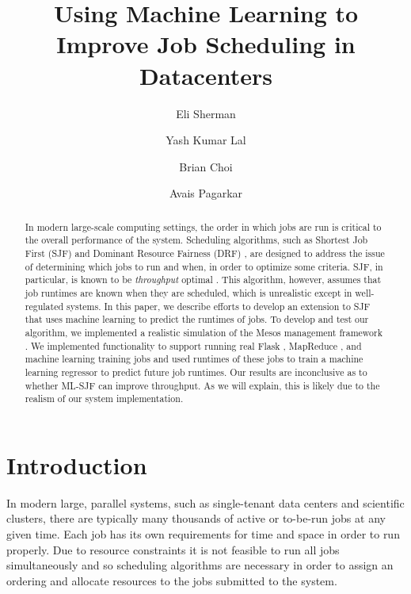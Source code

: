 \documentclass{hotnets19}
\begin{document}


\title{Using Machine Learning to Improve Job Scheduling in Datacenters}

\author{Eli Sherman \and Yash Kumar Lal \and Brian Choi \and Avais Pagarkar}

\maketitle

\begin{abstract}
In modern large-scale computing settings, the order in which jobs are run is critical to the overall performance of the system. Scheduling algorithms, such as Shortest Job First (SJF) and Dominant Resource Fairness (DRF) \cite{ghodsi2011dominant}, are designed to address the issue of determining which jobs to run and when, in order to optimize some criteria. SJF, in particular, is known to be \emph{throughput} optimal \cite{arpaci2015operating}. This algorithm, however, assumes that job runtimes are known when they are scheduled, which is unrealistic except in well-regulated systems. In this paper, we describe efforts to develop an extension to SJF that uses machine learning to predict the runtimes of jobs. To develop and test our algorithm, we implemented a realistic simulation of the Mesos management framework \cite{hindman2011mesos}. We implemented functionality to support running real Flask \cite{Flask}, MapReduce \cite{dean2008mapreduce}, and machine learning training jobs \cite{scikit-learn} and used runtimes of these jobs to train a machine learning regressor to predict future job runtimes. Our results are inconclusive as to whether ML-SJF can improve throughput. As we will explain, this is likely due to the realism of our system implementation.
\end{abstract}

\section{Introduction}

In modern large, parallel systems, such as single-tenant data centers and scientific clusters, there are typically many thousands of active or to-be-run jobs at any given time. Each job has its own requirements for time and space in order to run properly. Due to resource constraints it is not feasible to run all jobs simultaneously and so scheduling algorithms are necessary in order to assign an ordering and allocate resources to the jobs submitted to the system.
\end{document}
